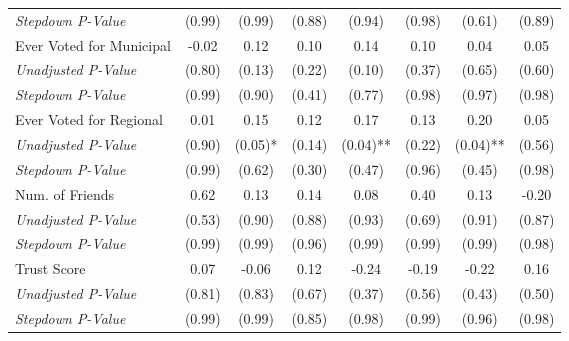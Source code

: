 \begin{tabular}{l c c c c c c c}
\quad \textit{Stepdown P-Value} & (0.99) & (0.99) & (0.88) & (0.94) & (0.98) & (0.61) & (0.89) \\
Ever Voted for Municipal & -0.02 & 0.12 & 0.10 & 0.14 & 0.10 & 0.04 & 0.05 \\
\quad \textit{Unadjusted P-Value} & (0.80) & (0.13) & (0.22) & (0.10) & (0.37) & (0.65) & (0.60) \\
\quad \textit{Stepdown P-Value} & (0.99) & (0.90) & (0.41) & (0.77) & (0.98) & (0.97) & (0.98) \\
Ever Voted for Regional & 0.01 & 0.15 & 0.12 & 0.17 & 0.13 & 0.20 & 0.05 \\
\quad \textit{Unadjusted P-Value} & (0.90) & (0.05)* & (0.14) & (0.04)** & (0.22) & (0.04)** & (0.56) \\
\quad \textit{Stepdown P-Value} & (0.99) & (0.62) & (0.30) & (0.47) & (0.96) & (0.45) & (0.98) \\
Num. of Friends & 0.62 & 0.13 & 0.14 & 0.08 & 0.40 & 0.13 & -0.20 \\
\quad \textit{Unadjusted P-Value} & (0.53) & (0.90) & (0.88) & (0.93) & (0.69) & (0.91) & (0.87) \\
\quad \textit{Stepdown P-Value} & (0.99) & (0.99) & (0.96) & (0.99) & (0.99) & (0.99) & (0.98) \\
Trust Score & 0.07 & -0.06 & 0.12 & -0.24 & -0.19 & -0.22 & 0.16 \\
\quad \textit{Unadjusted P-Value} & (0.81) & (0.83) & (0.67) & (0.37) & (0.56) & (0.43) & (0.50) \\
\quad \textit{Stepdown P-Value} & (0.99) & (0.99) & (0.85) & (0.98) & (0.99) & (0.96) & (0.98) \\
\bottomrule
\end{tabular}
